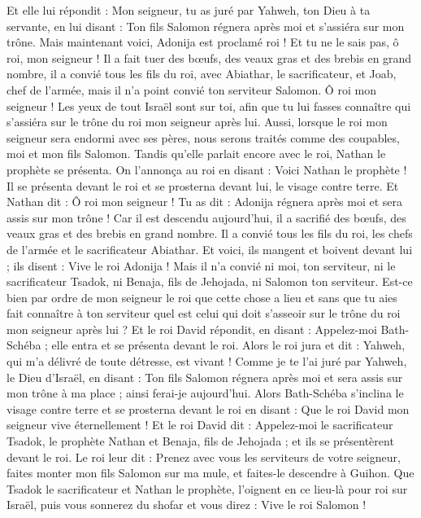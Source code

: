 \begin{multicols}{2}
Et elle lui répondit : Mon seigneur, tu as juré par Yahweh, ton Dieu à ta servante, en lui disant : Ton fils Salomon régnera après moi et s’assiéra sur mon trône.
Mais maintenant voici, Adonija est proclamé roi ! Et tu ne le sais pas, ô roi, mon seigneur !
Il a fait tuer des bœufs, des veaux gras et des brebis en grand nombre, il a convié tous les fils du roi, avec Abiathar, le sacrificateur, et Joab, chef de l'armée, mais il n'a point convié ton serviteur Salomon.
Ô roi mon seigneur ! Les yeux de tout Israël sont sur toi, afin que tu lui fasses connaître qui s’assiéra sur le trône du roi mon seigneur après lui.
Aussi, lorsque le roi mon seigneur sera endormi avec ses pères, nous serons traités comme des coupables, moi et mon fils Salomon.
Tandis qu’elle parlait encore avec le roi, Nathan le prophète se présenta.
On l’annonça au roi en disant : Voici Nathan le prophète ! Il se présenta devant le roi et se prosterna devant lui, le visage contre terre.
Et Nathan dit : Ô roi mon seigneur ! Tu as dit : Adonija régnera après moi et sera assis sur mon trône !
Car il est descendu aujourd'hui, il a sacrifié des bœufs, des veaux gras et des brebis en grand nombre. Il a convié tous les fils du roi, les chefs de l'armée et le sacrificateur Abiathar. Et voici, ils mangent et boivent devant lui ; ils disent : Vive le roi Adonija !
Mais il n'a convié ni moi, ton serviteur, ni le sacrificateur Tsadok, ni Benaja, fils de Jehojada, ni Salomon ton serviteur.
Est-ce bien par ordre de mon seigneur le roi que cette chose a lieu et sans que tu aies fait connaître à ton serviteur quel est celui qui doit s'asseoir sur le trône du roi mon seigneur après lui ?
Et le roi David répondit, en disant : Appelez-moi Bath-Schéba ; elle entra et se présenta devant le roi.
Alors le roi jura et dit : Yahweh, qui m'a délivré de toute détresse, est vivant !
Comme je te l'ai juré par Yahweh, le Dieu d'Israël, en disant : Ton fils Salomon régnera après moi et sera assis sur mon trône à ma place ; ainsi ferai-je aujourd'hui.
Alors Bath-Schéba s'inclina le visage contre terre et se prosterna devant le roi en disant : Que le roi David mon seigneur vive éternellement !
Et le roi David dit : Appelez-moi le sacrificateur Tsadok, le prophète Nathan et Benaja, fils de Jehojada ; et ils se présentèrent devant le roi.
Le roi leur dit : Prenez avec vous les serviteurs de votre seigneur, faites monter mon fils Salomon sur ma mule, et faites-le descendre à Guihon.
Que Tsadok le sacrificateur et Nathan le prophète, l'oignent en ce lieu-là pour roi sur Israël, puis vous sonnerez du shofar et vous direz : Vive le roi Salomon !

\end{multicols}
